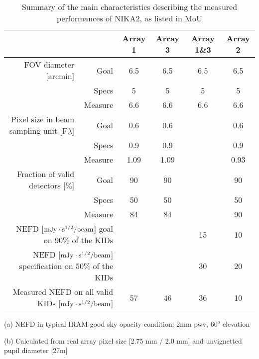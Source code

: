 \begin{table}[h]
  \caption[Main performance requirement]{Summary of the main characteristics describing the measured performances of NIKA2, as listed in MoU}
  \label{tab:nika2summary_main}
  \begin{threeparttable}
    \begin{tabular}{|r|r|c|c|c|c|}
      \hline
      \multicolumn{2}{|r|}{}           & Array 1 & Array 3  & Array 1\&3 & Array 2 \\
      \hline
      \hline
      FOV diameter [arcmin] & Goal     &  6.5 & 6.5  & 6.5 & 6.5   \\
                            & Specs    &   5  &   5  &   5 &   5   \\
                            & Measure  &  6.6 & 6.6  & 6.6 &  6.6  \\
      \hline
      Pixel size in beam sampling unit\tnote{b}\hspace{1mm} [F$\lambda$]  & Goal    & 0.6  &  0.6  &    &  0.6 \\
                                                     & Specs   & 0.9  &  0.9  &    &  0.9 \\
                                                     & Measure & 1.09 &  1.09 &    &  0.93 \\
      \hline
      Fraction of valid detectors [$\%$] & Goal     &   90      &    90    &      &     90  \\
                                         & Specs    &   50     &    50    &      &     50  \\
                                         & Measure  &   84     &    84    &      &     90  \\
      \hline
      \multicolumn{2}{|r|}{NEFD\tnote{a}\hspace{1mm} [$\rm{mJy} \cdot \rm{s}^{1/2}/\rm{beam}$] goal on $90\%$ of the KIDs} &  &  &  15  & 10 \\
      \multicolumn{2}{|r|}{NEFD\tnote{a}\hspace{1mm} [$\rm{mJy} \cdot \rm{s}^{1/2}/\rm{beam}$] specification on $50\%$ of the KIDs}  &       &     &  30  & 20 \\
      \multicolumn{2}{|r|}{Measured NEFD\tnote{a}\hspace{1mm} on all valid KIDs [$\rm{mJy} \cdot \rm{s}^{1/2}/\rm{beam}$]}           & 57  &  46   &  36  & 10 \\
      \hline\hline      
\end{tabular}
  \begin{tablenotes}
  \item[(a)] NEFD in typical IRAM good sky opacity condition: 2mm pwv, $60^o$ elevation
  \item[(b)] Calculated from real array pixel size [2.75 mm / 2.0 mm] and unvignetted pupil diameter [27m]
    \end{tablenotes}
\end{threeparttable}
\end{table} 


